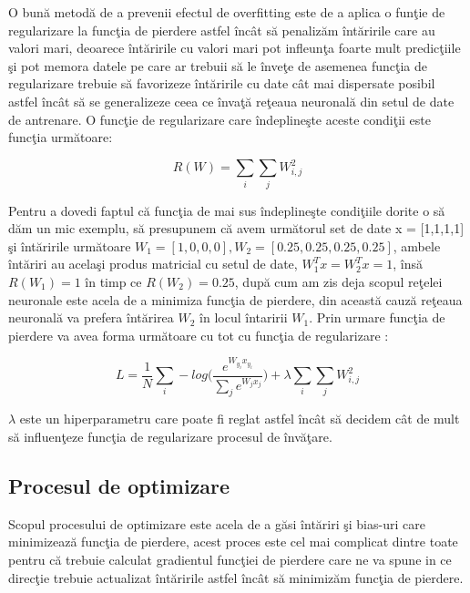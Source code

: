 O bun\u{a} metod\u{a} de a prevenii efectul de overfitting este de a aplica o fun\c{t}ie de regularizare la func\c{t}ia de pierdere astfel \^{i}nc\^{a}t s\u{a} penaliz\u{a}m \^{i}nt\u{a}ririle care au valori mari, deoarece \^{i}nt\u{a}ririle cu valori mari pot infleun\c{t}a  foarte mult predic\c{t}iile \c{s}i pot memora datele pe care ar trebuii s\u{a} le \^{i}nve\c{t}e de asemenea func\c{t}ia de regularizare trebuie s\u{a} favorizeze \^{i}nt\u{a}ririle cu date c\^{a}t mai dispersate posibil astfel \^{i}nc\^{a}t s\u{a} se generalizeze ceea ce \^{i}nva\c{t}\u{a} re\c{t}eaua neuronal\u{a} din setul de date de antrenare. O func\c{t}ie de regularizare care \^{i}ndepline\c{s}te aceste condi\c{t}ii este func\c{t}ia urm\u{a}toare:

$$ R(W) = \sum_i \sum_j W_{i,j}^2 $$

Pentru a dovedi faptul c\u{a} func\c{t}ia de mai sus \^{i}ndepline\c{s}te condi\c{t}iile dorite o s\u{a} d\u{a}m un mic exemplu, s\u{a} presupunem c\u{a} avem urm\u{a}torul set de date x = [1,1,1,1] \c{s}i \^{i}nt\u{a}ririle urm\u{a}toare $W_1 = [1,0,0,0], W_2 = [0.25, 0.25, 0.25, 0.25]$, ambele \^{i}nt\u{a}riri au acela\c{s}i produs matricial cu setul de date, $W^T_1 x = W^T_2 x = 1$, \^{i}ns\u{a} $R(W_1) = 1 $ \^{i}n timp ce $R(W_2) = 0.25$, dup\u{a} cum am zis deja scopul re\c{t}elei neuronale este acela de a minimiza func\c{t}ia de pierdere, din aceast\u{a} cauz\u{a} re\c{t}eaua neuronal\u{a} va prefera \^{i}nt\u{a}rirea $W_2$ \^{i}n locul \^{i}ntaririi $W_1$. Prin urmare func\c{t}ia de pierdere va avea forma urm\u{a}toare cu tot cu func\c{t}ia de regularizare :

$$L = \frac{1}{N} \sum_i - log \bigg(\frac{e^{W_y_i x_y_i}}{\sum_j e^{W_j x_j}}\bigg) + \lambda \sum_i \sum_j W_{i,j}^2 $$

$\lambda$ este un hiperparametru care poate fi reglat astfel \^{i}nc\^{a}t s\u{a} decidem c\^{a}t de mult s\u{a} influen\c{t}eze func\c{t}ia de regularizare procesul de \^{i}nv\u{a}\c{t}are.

\subsection{Procesul de optimizare}

Scopul procesului de optimizare este acela de a g\u{a}si  \^{i}nt\u{a}riri \c{s}i bias-uri care minimizeaz\u{a} func\c{t}ia de pierdere, acest proces este cel mai complicat dintre toate pentru c\u{a} trebuie calculat gradientul func\c{t}iei de pierdere care ne va spune in ce direc\c{t}ie trebuie actualizat \^{i}nt\u{a}ririle astfel \^{i}nc\^{a}t s\u{a} minimiz\u{a}m func\c{t}ia de pierdere.

